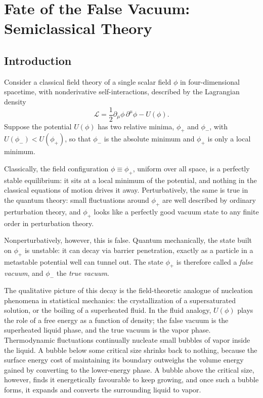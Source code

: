 \chapter{Fate of the False Vacuum: Semiclassical Theory}
\label{ch:semiclassical_theory}

\section{Introduction}

Consider a classical field theory of a single scalar field $\phi$ in four-dimensional spacetime, with nonderivative self-interactions, described by the Lagrangian density
\begin{equation}
\mathcal{L} = \frac{1}{2}\partial_\mu \phi \, \partial^\mu \phi - U(\phi).
\label{eq:lagrangian}
\end{equation}
Suppose the potential $U(\phi)$ has two relative minima, $\phi_+$ and $\phi_-$, with $U(\phi_-) < U(\phi_+)$, so that $\phi_-$ is the absolute minimum and $\phi_+$ is only a local minimum.


Classically, the field configuration $\phi \equiv \phi_+$, uniform over all space, is a perfectly stable equilibrium: it sits at a local minimum of the potential, and nothing in the classical equations of motion drives it away. Perturbatively, the same is true in the quantum theory: small fluctuations around $\phi_+$ are well described by ordinary perturbation theory, and $\phi_+$ looks like a perfectly good vacuum state to any finite order in perturbation theory.

Nonperturbatively, however, this is false. Quantum mechanically, the state built on $\phi_+$ is unstable: it can decay via barrier penetration, exactly as a particle in a metastable potential well can tunnel out. The state $\phi_+$ is therefore called a \emph{false vacuum}, and $\phi_-$ the \emph{true vacuum}.

The qualitative picture of this decay is the field-theoretic analogue of nucleation phenomena in statistical mechanics: the crystallization of a supersaturated solution, or the boiling of a superheated fluid. In the fluid analogy, $U(\phi)$ plays the role of a free energy as a function of density; the false vacuum is the superheated liquid phase, and the true vacuum is the vapor phase. Thermodynamic fluctuations continually nucleate small bubbles of vapor inside the liquid. A bubble below some critical size shrinks back to nothing, because the surface energy cost of maintaining its boundary outweighs the volume energy gained by converting to the lower-energy phase. A bubble above the critical size, however, finds it energetically favourable to keep growing, and once such a bubble forms, it expands and converts the surrounding liquid to vapor.

